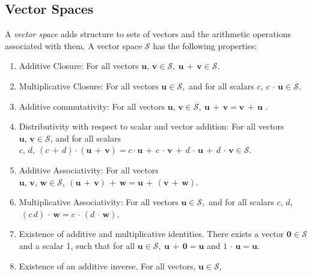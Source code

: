 \documentclass[graybox,envcountchap,sectrefs]{svmono}\usepackage[]{graphicx}\usepackage[]{xcolor}
\begin{document}
\begin{appendices}
\subsection{Vector Spaces}

A \emph{vector space} adds structure to sets of vectors and the arithmetic
operations associated with them. A vector space $\mathcal{{S}}$ has
the following properties:
\begin{enumerate}
\item Additive Closure: For all vectors $\mathrm{\mathbf{u}},\,\mathrm{\mathbf{v}}\in\mathcal{{S}},\ \mathrm{\mathbf{u}}\,+\,\mathrm{\mathbf{v}}\in\mathcal{{S}}$.
\item Multiplicative Closure: For all vectors $\mathrm{\mathbf{u}}\in\mathcal{{S}},$
and for all scalars $c,\ c\,\cdot\,\mathbf{u}\in\mathcal{{S}}$.
\item Additive commutativity: For all vectors $\mathrm{\mathbf{u}},\,\mathrm{\mathbf{v}}\in\mathcal{{S}},\ \mathrm{\mathbf{u}}\,+\,\mathrm{\mathbf{v}}=\mathrm{\mathbf{v}}\,+\,\mathrm{\mathbf{u}}$
. 
\item Distributivity with respect to scalar and vector addition: For all
vectors $\mathrm{\mathbf{u}},\,\mathrm{\mathbf{v}}\in\mathcal{{S}}$,
and for all scalars $c,\,d,\ (c\,+\,d)\cdot\left(\mathrm{\mathbf{u}}\,+\,\mathrm{\mathbf{v}}\right)=\mathit{c}\cdot\mathbf{\mathrm{\mathbf{u}}}\,+\,\mathit{c}\,\cdot\,\mathrm{\mathbf{v}}\,+\,\mathit{d}\,\cdot\,\mathrm{\mathbf{u}}\,+\,\mathit{d}\,\cdot\,\mathrm{\mathbf{v}}\in\mathcal{{S}}$.
\item Additive Associativity: For all vectors $\mathrm{\mathbf{u}},\,\mathrm{\mathbf{v},}\,\mathrm{\mathbf{w}}\in\mathcal{{S}},\ \left(\mathrm{\mathbf{u}}\,+\,\mathrm{\mathbf{v}}\right)\,+\,\mathrm{\mathbf{w}}=\mathrm{\mathbf{u}}\,+\,\left(\mathrm{\mathbf{v}}\,+\,\mathrm{\mathbf{w}}\right).$
\item Multiplicative Associativity: For all vectors $\mathrm{\mathbf{u}}\in\mathcal{{S}},$
and for all scalars $c,\,d$, $\mathrm{\ }\left(c\,d\right)\,\cdot\,\mathrm{\mathbf{w}}=c\,\cdot\,\left(d\,\cdot\,\mathrm{\mathbf{w}}\right).$
\item Existence of additive and multiplicative identities. There exists
a vector $\mathbf{\mathrm{\mathbf{0}}}\in\mathcal{{S}}$ and a scalar
1, such that for all $\mathrm{\mathbf{u}}\in\mathcal{{S}},\ \mathrm{\mathbf{u}\mathrm{\,+\,\mathbf{0}}}=\mathrm{\mathbf{u}}$
and $1\,\cdot\,\mathbf{u}=\mathbf{u}$.
\item Existence of an additive inverse. For all vectors, $\mathrm{\mathbf{u}}\in\mathcal{{S}},$

\end{enumerate}
\end{appendices}
\end{document}
